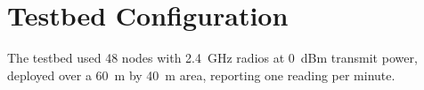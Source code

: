 \chapter{Testbed Configuration}
\label{app:a}

The testbed used 48 nodes with 2.4~GHz radios at 0~dBm transmit power, deployed over a
60~m by 40~m area, reporting one reading per minute.
